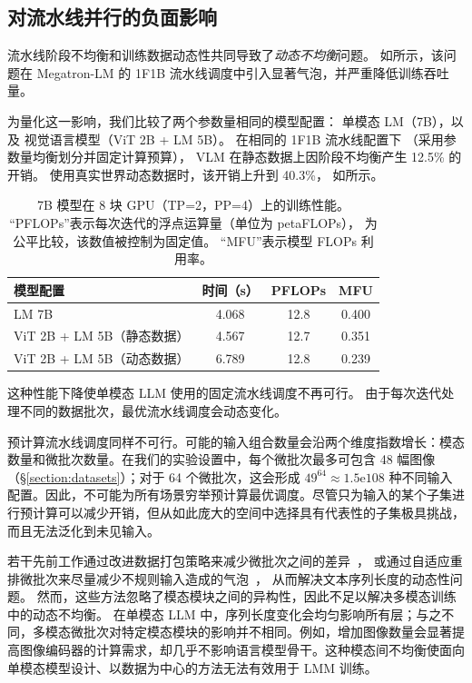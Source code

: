 \subsection{对流水线并行的负面影响}
\label{section:impact-on-pipeline-parallelism}

流水线阶段不均衡和训练数据动态性共同导致了\emph{动态不均衡}问题。
如所示，该问题在 Megatron-LM 的 1F1B 流水线调度中引入显著气泡，并严重降低训练吞吐量。

为量化这一影响，我们比较了两个参数量相同的模型配置：
单模态 LM（7B），以及
视觉语言模型（ViT 2B + LM 5B）。
在相同的 1F1B 流水线配置下
（采用参数量均衡划分并固定计算预算），
VLM 在静态数据上因阶段不均衡产生 12.5\% 的开销。
使用真实世界动态数据时，该开销上升到 40.3\%，
如所示。

\begin{table}[t]
    \caption{
        7B 模型在 8 块 GPU（TP=2，PP=4）上的训练性能。
        “PFLOPs”表示每次迭代的浮点运算量（单位为 petaFLOPs），
        为公平比较，该数值被控制为固定值。
        “MFU”表示模型 FLOPs 利用率。
    }
    \label{table:imbalanced-pipeline}
    \small
    \begin{tabular}{>{\raggedright}p{3.7cm}ccc}
    \toprule
    \textbf{模型配置} & \textbf{时间（s）} & \textbf{PFLOPs} & \textbf{MFU} \\
    \midrule
    LM 7B & 4.068 & 12.8 & 0.400 \\
    ViT 2B + LM 5B（静态数据） & 4.567 & 12.7 & 0.351 \\
    ViT 2B + LM 5B（动态数据） & 6.789 & 12.8 & 0.239 \\
    \bottomrule
    \end{tabular}
\end{table}

这种性能下降使单模态 LLM 使用的固定流水线调度不再可行。
由于每次迭代处理不同的数据批次，最优流水线调度会动态变化。

预计算流水线调度同样不可行。可能的输入组合数量会沿两个维度指数增长：模态数量和微批次数量。在我们的实验设置中，每个微批次最多可包含 48 幅图像（\S\ref{section:datasets}）；对于 64 个微批次，这会形成 $49^{64} \approx 1.5\mathrm{e}108$ 种不同输入配置。因此，不可能为所有场景穷举预计算最优调度。尽管只为输入的某个子集进行预计算可以减少开销，但从如此庞大的空间中选择具有代表性的子集极具挑战，而且无法泛化到未见输入。

若干先前工作通过改进数据打包策略来减少微批次之间的差异~\cite{wlb-llm-osdi25}，
或通过自适应重排微批次来尽量减少不规则输入造成的气泡~\cite{dynapipe-eurosys24,flexpipe-atc25}，
从而解决文本序列长度的动态性问题。
然而，这些方法忽略了模态模块之间的异构性，因此不足以解决多模态训练中的动态不均衡。
在单模态 LLM 中，序列长度变化会均匀影响所有层；与之不同，多模态微批次对特定模态模块的影响并不相同。例如，增加图像数量会显著提高图像编码器的计算需求，却几乎不影响语言模型骨干。这种模态间不均衡使面向单模态模型设计、以数据为中心的方法无法有效用于 LMM 训练。
